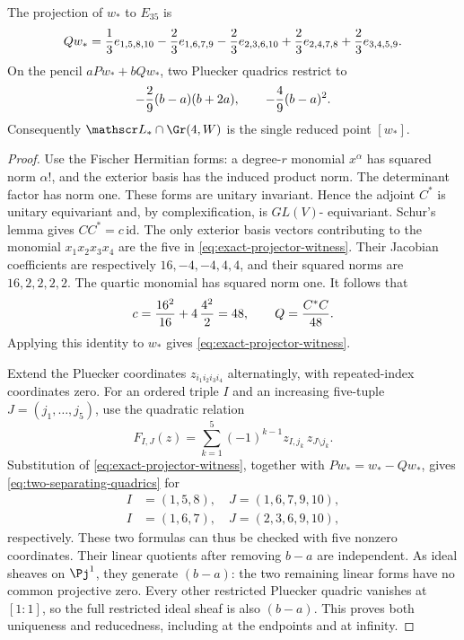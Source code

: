 \begin{lemma}
\label{lem:exact-plucker-pencil}
The projection of \(w_*\) to \(E_{35}\) is
\begin{equation}\label{eq:exact-projector-witness}
 Qw_*={1\over3}e_{1,5,8,10}
       -{2\over3}e_{1,6,7,9}
       -{2\over3}e_{2,3,6,10}
       +{2\over3}e_{2,4,7,8}
       +{2\over3}e_{3,4,5,9}.
\end{equation}
On the pencil \(aPw_*+bQw_*\), two Pluecker quadrics restrict to
\begin{equation}\label{eq:two-separating-quadrics}
 -{2\over9}(b-a)(b+2a),\qquad
 -{4\over9}(b-a)^2.
\end{equation}
Consequently \(\mathscr L_*\cap\Gr(4,W)\) is the single
reduced point \([w_*]\).
\end{lemma}
\begin{proof}
Use the Fischer Hermitian forms: a degree-\(r\) monomial
\(x^\alpha\) has squared norm \(\alpha!\), and the exterior
basis has the induced product norm.  The determinant factor has norm
one.  These forms are unitary invariant.  Hence the adjoint \(C^*\)
is unitary equivariant and, by complexification, is \(GL(V)\)-
equivariant.  Schur's lemma gives \(CC^*=c\,\mathrm{id}\).
The only exterior basis vectors contributing to the monomial
\(x_1x_2x_3x_4\) are the five in
\eqref{eq:exact-projector-witness}.  Their Jacobian coefficients
are respectively \(16,-4,-4,4,4\), and their squared norms are
\(16,2,2,2,2\).  The quartic monomial has squared norm one.
It follows that
\[
 c={16^2\over16}+4\,{4^2\over2}=48,
 \qquad Q={C^*C\over48}.
\]
Applying this identity to \(w_*\) gives
\eqref{eq:exact-projector-witness}.

Extend the Pluecker coordinates \(z_{i_1i_2i_3i_4}\)
alternatingly, with repeated-index coordinates zero.  For an ordered
triple \(I\) and an increasing five-tuple \(J=(j_1,\ldots,j_5)\),
use the quadratic relation
\[
 F_{I,J}(z)=\sum_{k=1}^5(-1)^{k-1}
              z_{I,j_k}\,z_{J\setminus j_k}.
\]
Substitution of \eqref{eq:exact-projector-witness}, together with
\(Pw_*=w_*-Qw_*\), gives \eqref{eq:two-separating-quadrics}
for
\[
 \begin{split}
 I&=(1,5,8),\quad J=(1,6,7,9,10),\\
 I&=(1,6,7),\quad J=(2,3,6,9,10),
 \end{split}
\]
respectively.  These two formulas can thus be checked with five
nonzero coordinates.  Their linear quotients after removing
\(b-a\) are independent.  As ideal sheaves on \(\Pj^1\),
they generate \((b-a)\): the two remaining linear forms have no
common projective zero.  Every other restricted Pluecker quadric
vanishes at \([1:1]\), so the full restricted ideal sheaf is also
\((b-a)\).  This proves both uniqueness and reducedness, including
at the endpoints and at infinity.
\end{proof}


